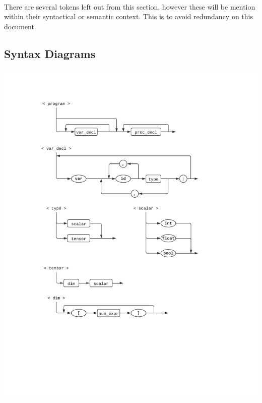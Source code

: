 \documentclass[12pt, titlepage]{article}
\begin{document}
\paragraph{} There are several tokens left out from this section, however these
will be mention within their syntactical or semantic context. This is to avoid 
redundancy on this document.

\subsection{Syntax Diagrams}

\includegraphics[trim={1in, 1in, 1in, 1in}, clip, scale=0.95]{d1}
\newpage
\end{document}
